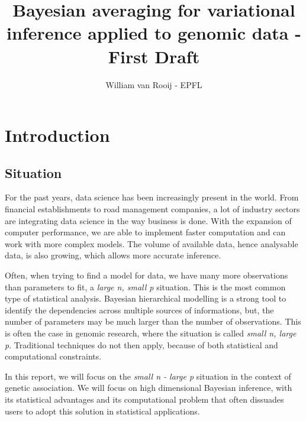 \documentclass[a4paper, 11pt]{report}
\numberwithin{equation}{section}
\begin{document}
\title{Bayesian averaging for variational inference applied to genomic data - First Draft}
\author{William van Rooij - EPFL}

\maketitle

\newpage
\tableofcontents
\newpage
\chapter{Introduction}
\section{Situation}
For the past years, data science has been increasingly present in the world. From financial establishments to road management companies, a lot of industry sectors are integrating data science in the way business is done. With the expansion of computer performance, we are able to implement faster computation and can work with more complex models. The volume of available data, hence analysable data, is also growing, which allows more accurate inference.

Often, when trying to find a model for data, we have many more observations than parameters to fit, a \textit{large n, small p} situation. This is the most common type of statistical analysis. Bayesian hierarchical modelling is a strong tool to identify the dependencies across multiple sources of informations, but, the number of parameters may be much larger than the number of observations. This is often the case in genomic research, where the situation is called \textit{small n, large p}. Traditional techniques do not then apply, because of both statistical and computational constraints.

In this report, we will focus on the \textit{small n - large p} situation in the context of genetic association. We will focus on high dimensional Bayesian inference, with its statistical advantages and its computational problem that often dissuades users to adopt this solution in statistical applications.
\end{document}

